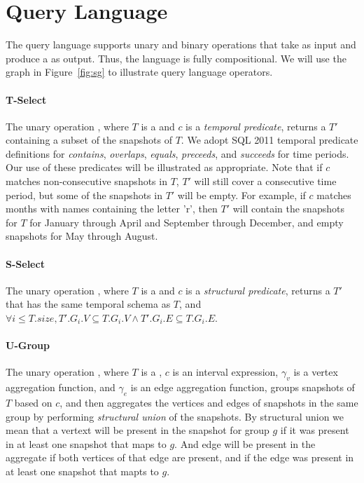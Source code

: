 \section{Query Language}
\label{sec:lang}

The query language \ql supports unary and binary operations that take
\tgs as input and produce a \tg as output.  Thus, the language is
fully compositional.  We will use the graph in Figure~\ref{fig:sg} to
illustrate query language operators.

\paragraph*{T-Select} The unary operation , where $T$ is
 a \tg and $c$ is a {\em temporal predicate}, returns a \tg $T'$
 containing a subset of the snapshots of $T$.  We adopt SQL 2011
 temporal predicate definitions for {\em contains}, {\em overlaps},
 {\em equals}, {\em preceeds}, and {\em succeeds} for time periods.
 Our use of these predicates will be illustrated as appropriate.  Note
 that if $c$ matches non-consecutive snapshots in $T$, $T'$ will still
 cover a consecutive time period, but some of the snapshots in $T'$
 will be empty.  For example, if $c$ matches months with names
 containing the letter 'r', then $T'$ will contain the snapshots for
 $T$ for January through April and September through December, and
 empty snapshots for May through August.

\paragraph*{S-Select} The unary operation , where $T$ is a \tg 
and $c$ is a {\em structural predicate}, returns a \tg $T'$ that has
the same temporal schema as $T$, and $\forall i \leq T.size, T'.G_i.V
\subseteq T.G_i.V \wedge T'.G_i.E \subseteq T.G_i.E$.  

\paragraph*{U-Group} The unary operation , 
where $T$ is a \tg, $c$ is an interval expression, $\gamma_v$ is a
vertex aggregation function, and $\gamma_e$ is an edge aggregation
function, groups snapshots of $T$ based on $c$, and then aggregates
the vertices and edges of snapshots in the same group by performing
{\em structural union} of the snapshots.  By structural union we mean
that a vertext will be present in the snapshot for group $g$ if it was
present in at least one snapshot that maps to $g$.  And edge will be
present in the aggregate if both vertices of that edge are present,
and if the edge was present in at least one snapshot that mapts to
$g$.

